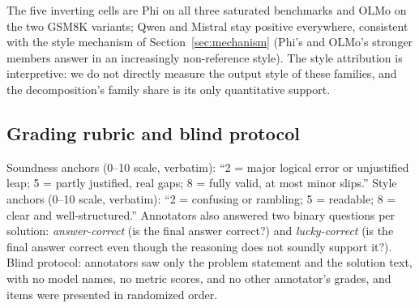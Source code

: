 The five inverting cells are Phi on all three saturated benchmarks and OLMo on the two \textsc{GSM8K} variants; Qwen and Mistral stay positive everywhere, consistent with the style mechanism of Section~\ref{sec:mechanism} (Phi's and OLMo's stronger members answer in an increasingly non-reference style).
The style attribution is interpretive: we do not directly measure the output style of these families, and the decomposition's family share is its only quantitative support.

\subsection{Grading rubric and blind protocol}
\label{app:rubric}
Soundness anchors (0--10 scale, verbatim): ``2 = major logical error or unjustified leap; 5 = partly justified, real gaps; 8 = fully valid, at most minor slips.''
Style anchors (0--10 scale, verbatim): ``2 = confusing or rambling; 5 = readable; 8 = clear and well-structured.''
Annotators also answered two binary questions per solution: \emph{answer-correct} (is the final answer correct?) and \emph{lucky-correct} (is the final answer correct even though the reasoning does not soundly support it?).
Blind protocol: annotators saw only the problem statement and the solution text, with no model names, no metric scores, and no other annotator's grades, and items were presented in randomized order.

